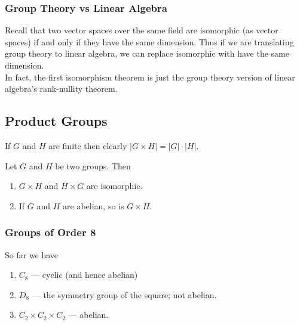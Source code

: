 
\subsubsection{Group Theory vs Linear Algebra}

Recall that two vector spaces over the same field are isomorphic (as vector spaces) if and only if they have the same dimension. Thus if we are translating group theory to linear algebra, we can replace isomorphic with have the same dimension. \\

In fact, the first isomorphism theorem is just the group theory version of linear algebra's rank-nullity theorem.

\subsection{Product Groups}


If \(G\) and \(H\) are finite then clearly \(|G \times H| = |G| \cdot |H|\).

\begin{proposition}
    Let \(G\) and \(H\) be two groups. Then
    \begin{enumerate}[label=\alph*)]
        \item \(G \times H\) and \(H \times G\) are isomorphic.
        \item If \(G\) and \(H\) are abelian, so is \(G \times H\).
    \end{enumerate}
\end{proposition}

\subsubsection{Groups of Order 8}
So far we have
\begin{enumerate}
    \item \(C_8\) --- cyclic (and hence abelian)
    \item \(D_8\) --- the symmetry group of the square; not abelian.
    \item \(C_2 \times C_2 \times C_2\) --- abelian.
\end{enumerate}

